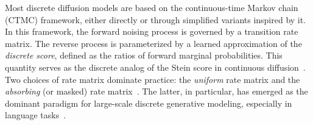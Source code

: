 \documentclass{article} %
\begin{document}
Most discrete diffusion models are based on the continuous-time Markov chain (CTMC) framework, either directly or through simplified variants inspired by it. In this framework, the forward noising process is governed by a transition rate matrix. The reverse process is parameterized by a learned approximation of the \emph{discrete score}, defined as the ratios of forward marginal probabilities. This quantity serves as the discrete analog of the Stein score in continuous diffusion~\citep{campbell2022continuous,meng2022concrete,lou2024discrete}. Two choices of rate matrix dominate practice: the \emph{uniform} rate matrix and the \emph{absorbing} (or masked) rate matrix~\citep{austin2021structured,lou2024discrete,shi2024simplified}. The latter, in particular, has emerged as the dominant paradigm for large-scale discrete generative modeling, especially in language tasks~\citep{sahoo2024simple,nie2026large}.
\end{document}
